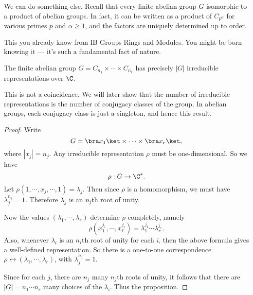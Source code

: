 \documentclass[a4paper]{article}
\begin{document}
We can do something else. Recall that every finite abelian group $G$ isomorphic to a product of abelian groups. In fact, it can be written as a product of $C_{p^\alpha}$ for various primes $p$ and $\alpha \geq 1$, and the factors are uniquely determined up to order.

This you already know from IB Groups Rings and Modules. You might be born knowing it --- it's such a fundamental fact of nature.

\begin{prop}
  The finite abelian group $G = C_{n_1} \times \cdots \times C_{n_r}$ has precisely $|G|$ irreducible representations over $\C$.
\end{prop}
This is not a coincidence. We will later show that the number of irreducible representations is the number of conjugacy classes of the group. In abelian groups, each conjugacy class is just a singleton, and hence this result.

\begin{proof}
  Write
  \[
    G = \bra x_1\ket \times \cdots \times \bra x_r\ket,
  \]
  where $|x_j| = n_j$. Any irreducible representation $\rho$ must be one-dimensional. So we have
  \[
    \rho: G \to \C^*.
  \]
  Let $\rho(1, \cdots, x_j, \cdots, 1) = \lambda_j$. Then since $\rho$ is a homomorphism, we must have $\lambda_j^{n_j} = 1$. Therefore $\lambda_j$ is an $n_j$th root of unity.

  Now the values $(\lambda_1, \cdots, \lambda_r)$ determine $\rho$ completely, namely
  \[
    \rho(x_1^{j_1}, \cdots, x_r^{j_r}) = \lambda_1^{j_1} \cdots \lambda_r ^{j_r}.
  \]
  Also, whenever $\lambda_i$ is an $n_i$th root of unity for each $i$, then the above formula gives a well-defined representation. So there is a one-to-one correspondence $\rho \leftrightarrow (\lambda_1, \cdots, \lambda_r)$, with $\lambda_j^{n_j} = 1$.

  Since for each $j$, there are $n_j$ many $n_j$th roots of unity, it follows that there are $|G| = n_1\cdots n_r$ many choices of the $\lambda_i$. Thus the proposition.
\end{proof}
\end{document}
